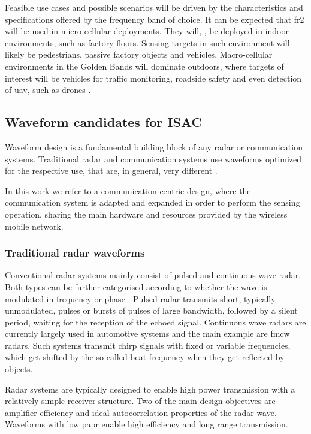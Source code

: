 	Feasible use cases and possible scenarios will be driven by the characteristics and specifications offered by the frequency band of choice. It can be expected that \Gls{fr2} will be used in micro-cellular deployments. They will, \eg, be deployed in indoor environments, such as factory floors. Sensing targets in such environment will likely be pedestrians, passive factory objects and vehicles.
	Macro-cellular environments in the Golden Bands will dominate outdoors, where targets of interest will be vehicles for traffic monitoring, roadside safety and even detection of \gls{uav}, such as drones \cite{Mandelli_Henninger_Bauhofer_Wild_2023}.
	
	\subsection{Waveform candidates for ISAC}
	
	Waveform design is a fundamental building block of any radar or communication systems. Traditional radar and communication systems use waveforms optimized for the respective use, that are, in general, very different \cite{Zhang_Rahman_Wu_Huang_Guo_Chen_Yuan_2022}.
	
	In this work we refer to a communication-centric design, where the communication system is adapted and expanded in order to perform the sensing operation, sharing the main hardware and resources provided by the wireless mobile network.
	 
	
	\subsubsection{Traditional radar waveforms}
	
	Conventional radar systems mainly consist of pulsed and continuous wave radar. Both types can be further categorised according to whether the wave is modulated in frequency or phase \cite{Friedlander_2007}.
	Pulsed radar transmits short, typically unmodulated, pulses or bursts of pulses of large bandwidth, followed by a silent period, waiting for the reception of the echoed signal. Continuous wave radars are currently largely used in automotive systems and the main example are \gls{fmcw} radars. Such systems transmit chirp signals with fixed or variable frequencies, which get shifted by the so called beat frequency when they get reflected by objects.
	
	Radar systems are typically designed to enable high power transmission with a relatively simple receiver structure. Two of the main design objectives are amplifier efficiency and ideal autocorrelation properties of the radar wave. Waveforms with low \gls{papr} enable high efficiency and long range transmission.
	
